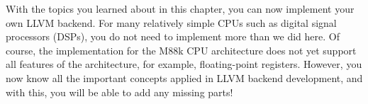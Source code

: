 With the topics you learned about in this chapter, you can now implement your own LLVM backend. For many relatively simple CPUs such as digital signal processors (DSPs), you do not need to implement more than we did here. Of course, the implementation for the M88k CPU architecture does not yet support all features of the architecture, for example, floating-point registers. However, you now know all the important concepts applied in LLVM backend development, and with this, you will be able to add any missing parts!\par















